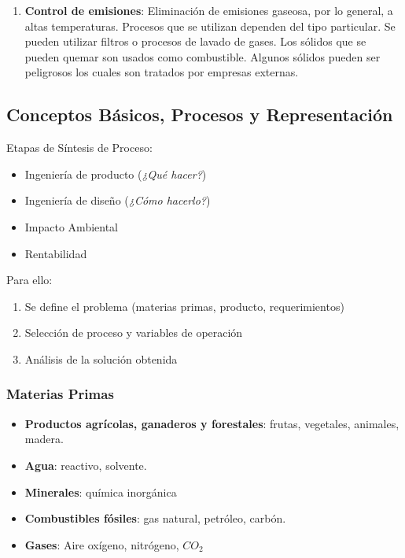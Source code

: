 \begin{enumerate}
            \item \textbf{Control de emisiones}: Eliminación de emisiones gaseosa, por lo general, a altas temperaturas. Procesos que se utilizan dependen del tipo particular. Se pueden utilizar filtros o procesos de lavado de gases. Los sólidos que se pueden quemar son usados como combustible. Algunos sólidos pueden ser peligrosos los cuales son tratados por empresas externas.
        \end{enumerate}
    
    \subsection{Conceptos Básicos, Procesos y Representación}
    
    Etapas de Síntesis de Proceso:
    
    \begin{multicols}{2}
        \begin{itemize}
            \item Ingeniería de producto (\textit{¿Qué hacer?})
            \item Ingeniería de diseño (\textit{¿Cómo hacerlo?})
            \item Impacto Ambiental
            \item Rentabilidad
        \end{itemize}
    \end{multicols}
    
    Para ello:
    
    \begin{enumerate}
        \item Se define el problema (materias primas, producto, requerimientos)
        \item Selección de proceso y variables de operación
        \item Análisis de la solución obtenida
    \end{enumerate}
    
        \subsubsection{Materias Primas}
        
        \begin{itemize}
            \item \textbf{Productos agrícolas, ganaderos y forestales}: frutas, vegetales, animales, madera.
            \item \textbf{Agua}: reactivo, solvente.
            \item \textbf{Minerales}: química inorgánica
            \item \textbf{Combustibles fósiles}: gas natural, petróleo, carbón.
            \item \textbf{Gases}: Aire oxígeno, nitrógeno, \(CO_{2}\)
        \end{itemize}
        
